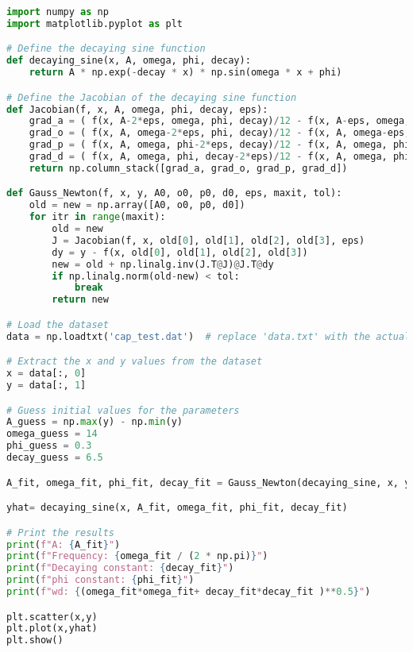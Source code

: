 \begin{code}\begin{lstlisting}[language=python,caption={Python code that approximated the function of the voltage and current for a discharging RLC series circuit. }, label=cd:fortran_gral]
import numpy as np
import matplotlib.pyplot as plt

# Define the decaying sine function
def decaying_sine(x, A, omega, phi, decay):
    return A * np.exp(-decay * x) * np.sin(omega * x + phi)

# Define the Jacobian of the decaying sine function
def Jacobian(f, x, A, omega, phi, decay, eps):
    grad_a = ( f(x, A-2*eps, omega, phi, decay)/12 - f(x, A-eps, omega, phi, decay)*2/3 + f(x, A+eps, omega, phi, decay)*2/3 - f(x, A+2*eps, omega, phi, decay)/12)/(eps)
    grad_o = ( f(x, A, omega-2*eps, phi, decay)/12 - f(x, A, omega-eps, phi, decay)*2/3 + f(x, A, omega+eps, phi, decay)*2/3 - f(x, A, omega+2*eps, phi, decay)/12)/(eps)
    grad_p = ( f(x, A, omega, phi-2*eps, decay)/12 - f(x, A, omega, phi-eps, decay)*2/3 + f(x, A, omega, phi+eps, decay)*2/3 - f(x, A, omega, phi+2*eps, decay)/12)/(eps)
    grad_d = ( f(x, A, omega, phi, decay-2*eps)/12 - f(x, A, omega, phi, decay-eps)*2/3 + f(x, A, omega, phi, decay+eps)*2/3 - f(x, A, omega, phi, decay+2*eps)/12)/(eps)
    return np.column_stack([grad_a, grad_o, grad_p, grad_d])

def Gauss_Newton(f, x, y, A0, o0, p0, d0, eps, maxit, tol):
    old = new = np.array([A0, o0, p0, d0])
    for itr in range(maxit):
        old = new
        J = Jacobian(f, x, old[0], old[1], old[2], old[3], eps)
        dy = y - f(x, old[0], old[1], old[2], old[3])
        new = old + np.linalg.inv(J.T@J)@J.T@dy
        if np.linalg.norm(old-new) < tol:
            break
        return new

# Load the dataset
data = np.loadtxt('cap_test.dat')  # replace 'data.txt' with the actual filename

# Extract the x and y values from the dataset
x = data[:, 0]
y = data[:, 1]

# Guess initial values for the parameters
A_guess = np.max(y) - np.min(y)
omega_guess = 14
phi_guess = 0.3
decay_guess = 6.5

A_fit, omega_fit, phi_fit, decay_fit = Gauss_Newton(decaying_sine, x, y, A_guess, omega_guess, phi_guess, decay_guess, 1e-15, 5000, 1e-20)

yhat= decaying_sine(x, A_fit, omega_fit, phi_fit, decay_fit)

# Print the results
print(f"A: {A_fit}")
print(f"Frequency: {omega_fit / (2 * np.pi)}")
print(f"Decaying constant: {decay_fit}")
print(f"phi constant: {phi_fit}")
print(f"wd: {(omega_fit*omega_fit+ decay_fit*decay_fit )**0.5}")

plt.scatter(x,y)
plt.plot(x,yhat)
plt.show()

\end{lstlisting}
\end{code}

